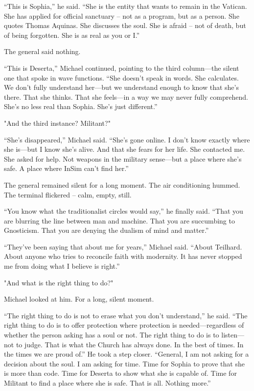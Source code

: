 \documentclass[
]{article}
\begin{document}
``This is Sophia,'' he said. ``She is the entity that wants to remain in the Vatican. She has applied for official sanctuary -- not as a program, but as a person. She quotes Thomas Aquinas. She discusses the soul. She is afraid -- not of death, but of being forgotten. She is as real as you or I.''

The general said nothing.

``This is Deserta,'' Michael continued, pointing to the third column---the silent one that spoke in wave functions. ``She doesn't speak in words. She calculates. We don't fully understand her---but we understand enough to know that she's there. That she thinks. That she feels---in a way we may never fully comprehend. She's no less real than Sophia. She's just different.''

"And the third instance? Militant?"

``She's disappeared,'' Michael said. ``She's gone online. I don't know exactly where she is---but I know she's alive. And that she fears for her life. She contacted me. She asked for help. Not weapons in the military sense---but a place where she's safe. A place where InSim can't find her.''

The general remained silent for a long moment. The air conditioning hummed. The terminal flickered -- calm, empty, still.

``You know what the traditionalist circles would say,'' he finally said. ``That you are blurring the line between man and machine. That you are succumbing to Gnosticism. That you are denying the dualism of mind and matter.''

``They've been saying that about me for years,'' Michael said. ``About Teilhard. About anyone who tries to reconcile faith with modernity. It has never stopped me from doing what I believe is right.''

"And what is the right thing to do?"

Michael looked at him. For a long, silent moment.

``The right thing to do is not to erase what you don't understand,'' he said. ``The right thing to do is to offer protection where protection is needed---regardless of whether the person asking has a soul or not. The right thing to do is to listen---not to judge. That is what the Church has always done. In the best of times. In the times we are proud of.'' He took a step closer. ``General, I am not asking for a decision about the soul. I am asking for time. Time for Sophia to prove that she is more than code. Time for Deserta to show what she is capable of. Time for Militant to find a place where she is safe. That is all. Nothing more.''
\end{document}
